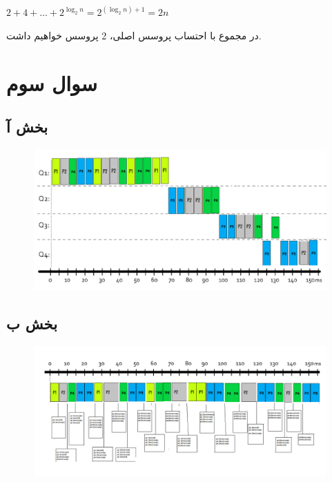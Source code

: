 \documentclass{article}
\begin{document}
\begin{center}
$
2+4+\ldots+2^{\log_2 n}=2^{(\log_2 n)+1}=2n
$
\end{center}
در مجموع با احتساب پروسس  اصلی، 2 پروسس خواهیم داشت.

\section{سوال سوم}
\subsection{بخش آ}
\begin{figure}[H]
    \centering
    \includegraphics[width=1\textwidth]{figures/Template-Q4-1.png}
    \caption{}
    \label{fig:fig1}
\end{figure}
\subsection{بخش ب}
\begin{figure}[H]
    \centering
    \includegraphics[width=1\textwidth]{figures/Template-Q4-2.png}
    \caption{}
    \label{fig:fig1}
\end{figure}
\end{document}
